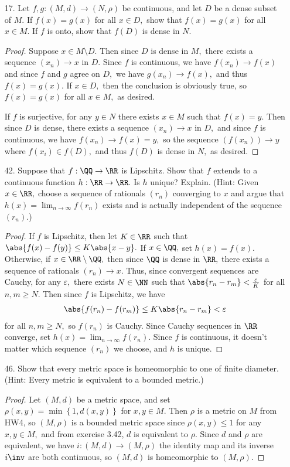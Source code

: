 \documentclass{article}
\begin{document}
\begin{itemize}
	\item[17.] Let $f, g:(M, d)\to(N, \rho)$ be continuous, and let $D$ be a dense subset of $M.$ If $f(x)=g(x)$ for all $x\in D,$ show that $f(x)=g(x)$ for all $x\in M.$ If $f$ is onto, show that $f(D)$ is dense in $N.$
		\begin{proof}
			Suppose $x\in M\setminus D.$ Then since $D$ is dense in $M,$ there exists a sequence $(x_n)\to x$ in $D.$ Since $f$ is continuous, we have $f(x_n)\to f(x)$ and since $f$ and $g$ agree on $D,$ we have $g(x_n)\to f(x),$ and thus $f(x)=g(x).$ If $x\in D,$ then the conclusion is obviously true, so $f(x)=g(x)$ for all $x\in M,$ as desired.

			If $f$ is surjective, for any $y\in N$ there exists $x\in M$ such that $f(x)=y.$ Then since $D$ is dense, there exists a sequence $(x_n)\to x$ in $D,$ and since $f$ is continuous, we have $f(x_n)\to f(x) = y,$ so the sequence $\left( f(x_n) \right)\to y$ where $f(x_i)\in f(D),$ and thus $f(D)$ is dense in $N,$ as desired.
		\end{proof}

	\item[42.] Suppose that $f:\QQ\to\RR$ is Lipschitz. Show that $f$ extends to a continuous function $h:\RR\to\RR.$ Is $h$ unique? Explain. (Hint: Given $x\in\RR,$ choose a sequence of rationals $(r_n)$ converging to $x$ and argue that $h(x)=\lim_{n\to\infty} f(r_n)$ exists and is actually independent of the sequence $(r_n).$)
		\begin{proof}
			If $f$ is Lipschitz, then let $K\in\RR$ such that $\abs{f(x)-f(y)}\le K\abs{x-y}.$ If $x\in\QQ,$ set $h(x)=f(x).$ Otherwise, if $x\in\RR\setminus\QQ,$ then since $\QQ$ is dense in $\RR,$ there exists a sequence of rationals $(r_n)\to x.$ Thus, since convergent sequences are Cauchy, for any $\varepsilon,$ there exists $N\in\NN$ such that $\abs{r_n-r_m}<\frac{\varepsilon}{K}$ for all $n, m\ge N.$ Then since $f$ is Lipschitz, we have
			\begin{align*}
				\abs{f(r_n)-f(r_m)}\le K\abs{r_n-r_m} < \varepsilon
			\end{align*}
			for all $n, m\ge N,$ so $f(r_n)$ is Cauchy. Since Cauchy sequences in $\RR$ converge, set $h(x)=\lim_{n\to\infty} f(r_n).$ Since $f$ is continuous, it doesn't matter which sequence $(r_n)$ we choose, and $h$ is unique.
		\end{proof}
 
	\item[46.] Show that every metric space is homeomorphic to one of finite diameter. (Hint: Every metric is equivalent to a bounded metric.)
		\begin{proof}
			Let $(M, d)$ be a metric space, and set $\rho(x, y)=\min\left\{ 1, d(x, y) \right\}$ for $x, y\in M.$ Then $\rho$ is a metric on $M$ from HW4, so $(M, \rho)$ is a bounded metric space since $\rho(x, y)\le 1$ for any $x, y\in M,$ and from exercise 3.42, $d$ is equivalent to $\rho.$ Since $d$ and $\rho$ are equivalent, we have $i:(M, d)\to (M, \rho)$ the identity map and its inverse $i\inv$ are both continuous, so $(M, d)$ is homeomorphic to $(M, \rho).$
		\end{proof}


\end{itemize}
\end{document}
